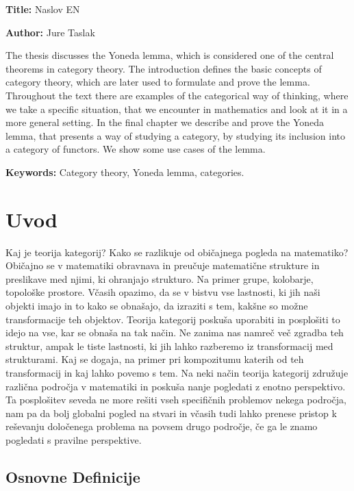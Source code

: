 \documentclass[12pt,a4paper]{book}
\newcommand{\ttitleEn}{Naslov EN}
\newcommand{\tauthor}{Jure Taslak}
\newcommand{\tkeywordsEn}{Category theory, Yoneda lemma, categories}
\newcommand{\clearemptydoublepage}{\newpage{\pagestyle{empty}\cleardoublepage}}
\theoremstyle{definition}
\theoremstyle{plain}
\theoremstyle{definition}
\theoremstyle{remark}
\begin{document}
\noindent\textbf{Title:} \ttitleEn
\bigskip

\noindent\textbf{Author:} \tauthor
\bigskip

\noindent 
The thesis discusses the Yoneda lemma, which is considered one of the central theorems in category theory. The introduction defines the basic concepts of category theory, which are later used to formulate and prove the lemma. Throughout the text there are examples of the categorical way of thinking, where we take a specific situation, that we encounter in mathematics and look at it in a more general setting. In the final chapter we describe and prove the Yoneda lemma, that presents a way of studying a category, by studying its inclusion into a category of functors. We show some use cases of the lemma.

\bigskip

\noindent\textbf{Keywords:} \tkeywordsEn.
\clearemptydoublepage

\mainmatter
\setcounter{page}{1}
\pagestyle{fancy}

\chapter{Uvod}
Kaj je teorija kategorij? Kako se razlikuje od običajnega pogleda na matematiko? Običajno se v matematiki obravnava in preučuje matematične strukture in preslikave med njimi, ki ohranjajo strukturo. Na primer grupe, kolobarje, topološke prostore. Včasih opazimo, da se v bistvu vse lastnosti, ki jih naši objekti imajo in to kako se obnašajo, da izraziti s tem, kakšne so možne transformacije teh objektov. Teorija kategorij poskuša uporabiti in posplošiti to idejo na vse, kar se obnaša na tak način. Ne zanima nas namreč več zgradba teh struktur, ampak le tiste lastnosti, ki jih lahko razberemo iz transformacij med strukturami. Kaj se dogaja, na primer pri kompozitumu katerih od teh transformacij in kaj lahko povemo s tem. Na neki način teorija kategorij združuje različna področja v matematiki in poskuša nanje pogledati z enotno perspektivo. Ta posplošitev seveda ne more rešiti vseh specifičnih problemov nekega področja, nam pa da bolj globalni pogled na stvari in včasih tudi lahko prenese pristop k reševanju določenega problema na povsem drugo področje, če ga le znamo pogledati s pravilne perspektive.

\section{Osnovne Definicije}
\end{document}
